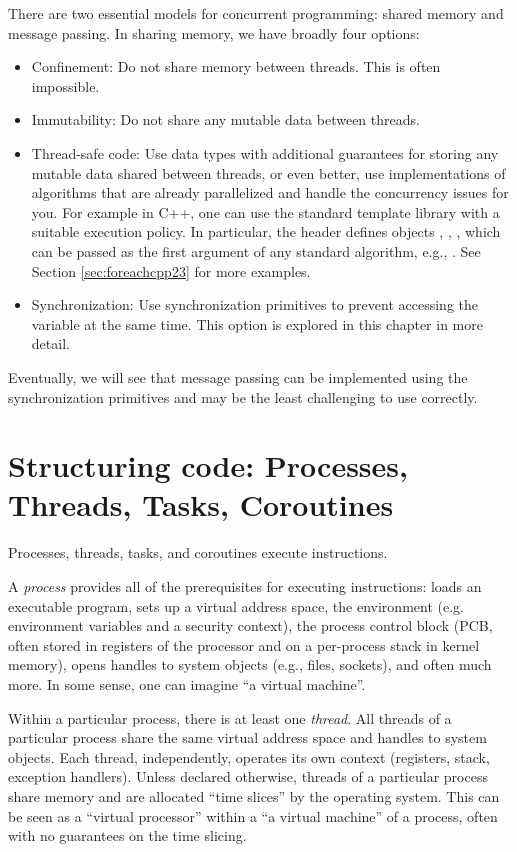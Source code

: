 There are two essential models for concurrent programming: shared memory and message passing. In sharing memory, we have broadly four options:
\begin{itemize}
\item Confinement: Do not share memory between threads. This is often impossible.
\item Immutability: Do not share any mutable data between threads. 
\item Thread-safe code: Use data types with additional guarantees for storing any mutable data shared between threads, or even better, use implementations of algorithms that are already parallelized and handle the concurrency issues for you. For example in C++, one can use the standard template library with a suitable execution policy. In particular, the header  defines objects , , , which can be passed as the first argument of any standard algorithm, e.g., . See Section \ref{sec:foreachcpp23} for more examples.
\item Synchronization: Use synchronization primitives to prevent accessing the variable at the same time. This option is explored in this chapter in more detail. 
\end{itemize}
Eventually, we will see that message passing can be implemented using the synchronization primitives and may be the least challenging to use correctly. 

\section{Structuring code: Processes, Threads, Tasks, Coroutines}

Processes, threads, tasks, and coroutines execute instructions. 

A \emph{process} provides all of the prerequisites for executing instructions: loads an executable program, sets up a virtual address space, the environment (e.g. environment variables and a security context), the process control block (PCB, often stored in registers of the processor and on a per-process stack in kernel memory), opens handles to system objects (e.g., files, sockets), and often much more. In some sense, one can imagine ``a virtual machine''.

Within a particular process, there is at least one \emph{thread}. All threads of a particular process share the same virtual address space and handles to system objects. Each thread, independently, operates its own context (registers, stack, exception handlers). Unless declared otherwise, threads of a particular process share memory and are allocated ``time slices'' by the operating system. This can be seen as a ``virtual processor'' within a ``a virtual machine'' of a process, often with no guarantees on the time slicing.

